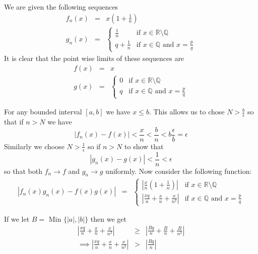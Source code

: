 \documentclass[11pt,reqno]{article}
\begin{document}
We are given the following sequences 
\begin{eqnarray*}
 f_n(x) &=& x(1 + \frac{1}{n}) \\
 g_n(x) &=& \left\{
	\begin{array}{ll}
		\frac{1}{n}  & \mbox{if } x \in \mathbb{R} \text{\textbackslash} \mathbb{Q} \\
		q + \frac{1}{n} & \mbox{if } x \in \mathbb{Q} \text{ and } x = \frac{p}{q}
	\end{array}
\right.
\end{eqnarray*}
It is clear that the point wise limits of these sequences are 
\begin{eqnarray*}
 f(x) &=& x\\
 g(x) &=& \left\{
	\begin{array}{ll}
		0 & \mbox{if } x \in \mathbb{R} \text{\textbackslash} \mathbb{Q} \\
		q & \mbox{if } x \in \mathbb{Q} \text{ and } x = \frac{p}{q}
	\end{array}
\right.
\end{eqnarray*}

For any bounded interval $[a,b]$ we have $x \le b$. This allows us to chose $N > \frac{b}{\epsilon}$ so that if $n > N$ we have
\[ |f_n(x) - f(x) | < \frac{x}{n} < \frac{b}{n}  < b \frac{\epsilon}{b} = \epsilon \]
Similarly we choose $N > \frac{1}{\epsilon}$ so if  $n > N$ to show that 
\[ |g_n(x) - g(x)| < \frac{1}{n} < \epsilon \]
so that both $f_n \to f$ and $g_n \to g$ uniformly.
Now consider the following function:
\begin{eqnarray*}
|f_n(x)g_n(x) - f(x)g(x)| &=& \left\{
	\begin{array}{ll}
		| \frac{x}{n}(1 + \frac{1}{n}) | & \mbox{if } x \in \mathbb{R} \text{\textbackslash} \mathbb{Q} \\
		| \frac{xq}{n} + \frac{x}{n} + \frac{x}{n^2} | & \mbox{if } x \in \mathbb{Q} \text{ and } x = \frac{p}{q}
	\end{array}
\right.
\end{eqnarray*}

If we let $B = $ Min $\{ |a|,|b| \}$ then we get 
\begin{eqnarray}
| \frac{xq}{n} + \frac{x}{n} + \frac{x}{n^2} | &\ge& |\frac{Bq}{n} + \frac{B}{n} + \frac{B}{n^2}| \nonumber \\
 \implies | \frac{xq}{n} + \frac{x}{n} + \frac{x}{n^2} | &>& |\frac{Bq}{n}| \label{eqn:lowbound}
\end{eqnarray}
\end{document}
